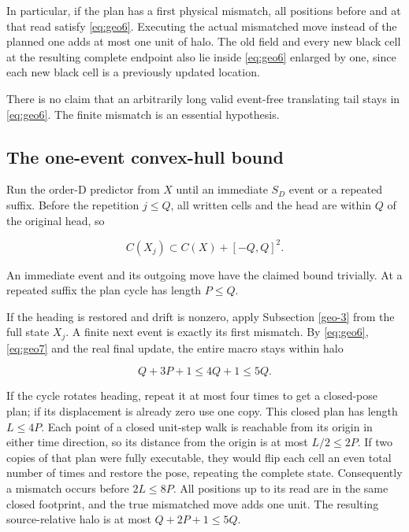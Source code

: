 \documentclass[
  11pt,
]{article}
\begin{document}
In particular, if the plan has a first physical mismatch, all positions
before and at that read satisfy \eqref{eq:geo6}. Executing the actual mismatched
move instead of the planned one adds at most one unit of halo. The old
field and every new black cell at the resulting complete endpoint also
lie inside \eqref{eq:geo6} enlarged by one, since each new black cell is a
previously updated location.

There is no claim that an arbitrarily long valid event-free translating
tail stays in \eqref{eq:geo6}. The finite mismatch is an essential hypothesis.

\subsection{The one-event convex-hull bound}\label{geo-4}

Run the order-D predictor from \(X\) until an immediate $S_D$ event or a
repeated suffix. Before the repetition $j\le Q$, all written cells
and the head are within \(Q\) of the original head, so

\begin{equation}\label{eq:geo7}
C(X_j)\subset C(X)+[-Q,Q]^2.
\end{equation}

An immediate event and its outgoing move have the claimed bound
trivially. At a repeated suffix the plan cycle has length $P\le Q$.

If the heading is restored and drift is nonzero, apply Subsection
\ref{geo-3} from the full state $X_j$. A finite next event is exactly its
first mismatch. By \eqref{eq:geo6},\eqref{eq:geo7} and the real final update, the entire
macro stays within halo

\begin{equation}\label{eq:geo8}
Q+3P+1\le4Q+1\le5Q.
\end{equation}

If the cycle rotates heading, repeat it at most four times to get a
closed-pose plan; if its displacement is already zero use one copy. This
closed plan has length $L\le4P$. Each point of a closed unit-step
walk is reachable from its origin in either time direction, so its
distance from the origin is at most $L/2\le2P$. If two copies of
that plan were fully executable, they would flip each cell an even total
number of times and restore the pose, repeating the complete state.
Consequently a mismatch occurs before $2L\le8P$. All positions up
to its read are in the same closed footprint, and the true mismatched
move adds one unit. The resulting source-relative halo is at most
$Q+2P+1\le5Q$.
\end{document}
